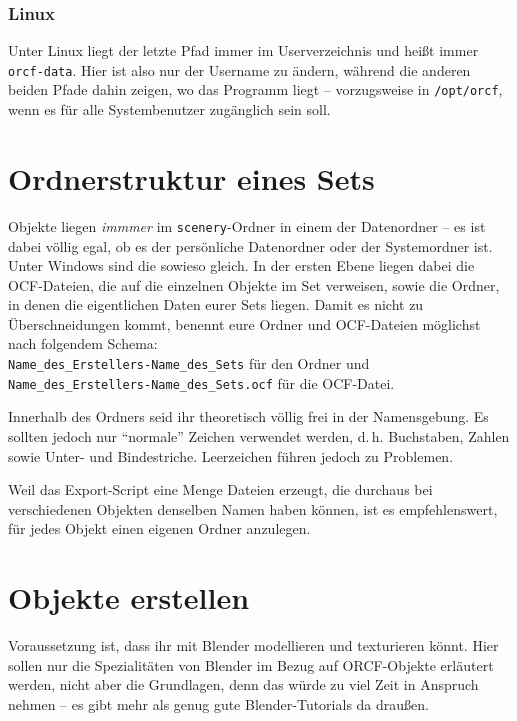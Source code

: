 \documentclass[a4paper]{article}
\newcommand{\cfile}[1]{\texttt{#1}}
\begin{document}
\subsubsection{Linux}
Unter Linux liegt der letzte Pfad immer im Userverzeichnis und heißt immer \cfile{orcf-data}. Hier ist also nur der Username zu ändern, während die
anderen beiden Pfade dahin zeigen, wo das Programm liegt -- vorzugsweise in \cfile{/opt/orcf}, wenn es für alle Systembenutzer zugänglich sein soll.


\section{Ordnerstruktur eines Sets}
Objekte liegen \emph{immmer} im \cfile{scenery}-Ordner in einem der Datenordner -- es ist dabei völlig egal, ob es der persönliche Datenordner oder der
Systemordner ist. Unter Windows sind die sowieso gleich. In der ersten Ebene liegen dabei die OCF-Dateien, die auf die einzelnen Objekte im Set
verweisen, sowie die Ordner, in denen die eigentlichen Daten eurer Sets liegen. Damit es nicht zu Überschneidungen kommt, benennt eure Ordner und
OCF-Dateien möglichst nach folgendem Schema:\\
\cfile{Name\_des\_Erstellers-Name\_des\_Sets} für den Ordner und \\
\cfile{Name\_des\_Erstellers-Name\_des\_Sets.ocf} für die OCF-Datei.

Innerhalb des Ordners seid ihr theoretisch völlig frei in der Namensgebung. Es sollten jedoch nur "`normale"' Zeichen verwendet werden, d.\,h.
Buchstaben, Zahlen sowie Unter- und Bindestriche. Leerzeichen führen jedoch zu Problemen.

Weil das Export-Script eine Menge Dateien erzeugt, die durchaus bei verschiedenen Objekten denselben Namen haben können, ist es empfehlenswert, für jedes
Objekt einen eigenen Ordner anzulegen.

\section{Objekte erstellen}
Voraussetzung ist, dass ihr mit Blender modellieren und texturieren könnt. Hier sollen nur die Spezialitäten von Blender im Bezug auf ORCF-Objekte
erläutert werden, nicht aber die Grundlagen, denn das würde zu viel Zeit in Anspruch nehmen -- es gibt mehr als genug gute Blender-Tutorials da draußen.
\end{document}
